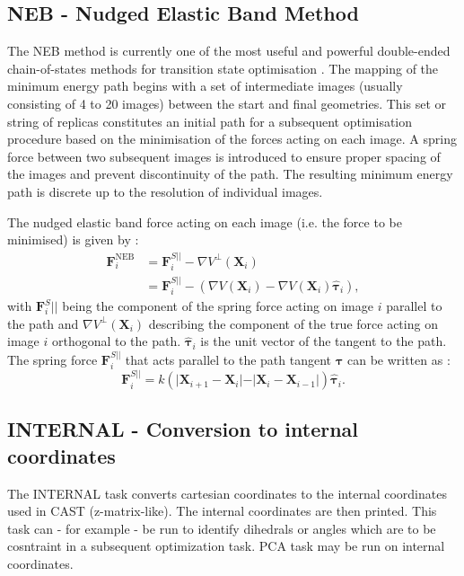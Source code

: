\documentclass[10pt,a4paper]{article} %
\newif\ifdevmode %
\begin{document}
	\subsection{NEB - Nudged Elastic Band Method}	
	The \acf{NEB} method is currently one of the most useful and powerful
double-ended chain-of-states methods for transition state optimisation \supercite{Wales2003}. The mapping
of the minimum energy path begins with a set of intermediate images (usually consisting of 4
to 20 images) between the start and final geometries. This set or string of replicas constitutes
an initial path for a subsequent optimisation procedure based on the minimisation of the forces
acting on each image. A spring force between two subsequent images is introduced to ensure
proper spacing of the images and prevent discontinuity of the path. The resulting minimum
energy path is discrete up to the resolution of individual images. 

The nudged elastic band force acting on each image (i.e. the force to be minimised) is given by \supercite{henkelman2002}:
\begin{align}
\bm{F}_i^{\mathrm{NEB}}&=\bm{F}_i^{S\vert\vert}-\nabla V^\perp(\bm{X}_i)\label{eq:fneb}\\
&=\bm{F}_i^{S\vert\vert}- \left(\nabla V(\bm{X}_i)-\nabla V(\bm{X}_i)\bm{\hat{\tau}}_i\right),
\end{align}
with $\bm{F}_i^{S}\vert\vert$ being the component of the spring force acting on image $i$ parallel to the path and $\nabla V^\perp (\bm{X}_i)$ describing the component of the true force acting on image $i$ orthogonal to the path. $\bm{\hat{\tau}}_i$ is the unit vector of the tangent to the path. The spring force $\bm{F}_i^{S\vert\vert}$ that acts parallel to the path tangent $\bm{\hat{\tau}}$ can be written as \supercite{Sheppard2008}: 
\begin{equation}
\label{eq:springf}
\bm{F}_i^{S\vert\vert}=k(\vert\bm{X}_{i+1}-\bm{X}_i\vert -\vert\bm{X}_{i}-\bm{X}_{i-1}\vert)\bm{\hat{\tau}}_i.
\end{equation}
	
	\subsection{INTERNAL - Conversion to internal coordinates}	
	The INTERNAL task converts cartesian coordinates to the internal coordinates used in CAST (z-matrix-like). The internal coordinates are then printed. This task can - for example - be run to identify dihedrals or angles which are to be cosntraint in a subsequent optimization task. \ac{PCA} task may be run on internal coordinates.
\end{document}
